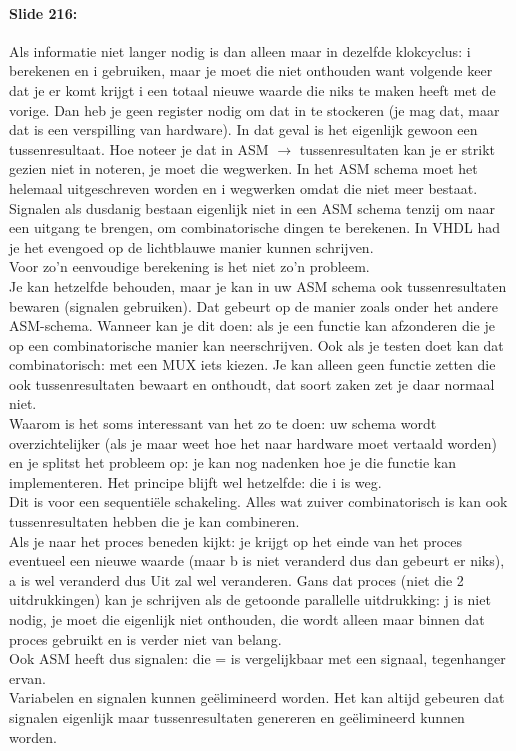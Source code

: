 \documentclass[10pt,a4paper]{book}
\begin{document}
\paragraph{Slide 216:} Als informatie niet langer nodig is dan alleen maar in dezelfde klokcyclus: i berekenen en i gebruiken, maar je moet die niet onthouden want volgende keer dat je er komt krijgt i een totaal nieuwe waarde die niks te maken heeft met de vorige. Dan heb je geen register nodig om dat in te stockeren (je mag dat, maar dat is een verspilling van hardware). In dat geval is het eigenlijk gewoon een tussenresultaat. Hoe noteer je dat in ASM $\rightarrow$ tussenresultaten kan je er strikt gezien niet in noteren, je moet die wegwerken. In het ASM schema moet het helemaal uitgeschreven worden en i wegwerken omdat die niet meer bestaat. Signalen als dusdanig bestaan eigenlijk niet in een ASM schema tenzij om naar een uitgang te brengen, om combinatorische dingen te berekenen. In VHDL had je het evengoed op de lichtblauwe manier kunnen schrijven.\\
Voor zo'n eenvoudige berekening is het niet zo'n probleem.\\
Je kan hetzelfde behouden, maar je kan in uw ASM schema ook tussenresultaten bewaren (signalen gebruiken). Dat gebeurt op de manier zoals onder het andere ASM-schema. Wanneer kan je dit doen: als je een functie kan afzonderen die je op een combinatorische manier kan neerschrijven. Ook als je testen doet kan dat combinatorisch: met een MUX iets kiezen. Je kan alleen geen functie zetten die ook tussenresultaten bewaart en onthoudt, dat soort zaken zet je daar normaal niet.\\
Waarom is het soms interessant van het zo te doen: uw schema wordt overzichtelijker (als je maar weet hoe het naar hardware moet vertaald worden) en je splitst het probleem op: je kan nog nadenken hoe je die functie kan implementeren. Het principe blijft wel hetzelfde: die i is weg.\\
Dit is voor een sequenti\"ele schakeling. Alles wat zuiver combinatorisch is kan ook tussenresultaten hebben die je kan combineren.\\
Als je naar het proces beneden kijkt: je krijgt op het einde van het proces eventueel een nieuwe waarde (maar b is niet veranderd dus dan gebeurt er niks), a is wel veranderd dus Uit zal wel veranderen. Gans dat proces (niet die 2 uitdrukkingen) kan je schrijven als de getoonde parallelle uitdrukking: j is niet nodig, je moet die eigenlijk niet onthouden, die wordt alleen maar binnen dat proces gebruikt en is verder niet van belang.\\
Ook ASM heeft dus signalen: die = is vergelijkbaar met een signaal, tegenhanger ervan.\\
Variabelen en signalen kunnen ge\"elimineerd worden. Het kan altijd gebeuren dat signalen eigenlijk maar tussenresultaten genereren en ge\"elimineerd kunnen worden.
\end{document}
